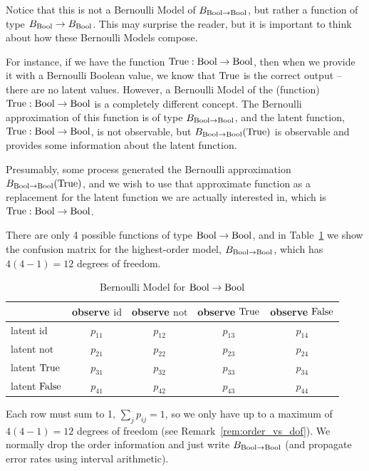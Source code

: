\documentclass[../main.tex]{subfiles}
\begin{document}
Notice that this is not a Bernoulli Model of $B_{\mathrm{Bool} \to \mathrm{Bool}}$, but rather a function of type $B_{\mathrm{Bool}} \to B_{\mathrm{Bool}}$. This may surprise the reader, but it is important to think about how these Bernoulli Models compose.

For instance, if we have the function $\mathrm{True} : \mathrm{Bool} \to \mathrm{Bool}$, then when we provide it with a Bernoulli Boolean value, we know that $\mathrm{True}$ is the correct output -- there are no latent values. However, a Bernoulli Model of the (function) $\mathrm{True} : \mathrm{Bool} \to \mathrm{Bool}$ is a completely different concept. The Bernoulli approximation of this function is of type $B_{\mathrm{Bool} \to \mathrm{Bool}}$, and the latent function, $\mathrm{True} : \mathrm{Bool} \to \mathrm{Bool}$, is not observable, but $B_{\mathrm{Bool} \to \mathrm{Bool}}(\mathrm{True})$ is observable and provides some information about the latent function.

Presumably, some process generated the Bernoulli approximation $B_{\mathrm{Bool} \to \mathrm{Bool}}(\mathrm{True})$, and we wish to use that approximate function as a replacement for the latent function we are actually interested in, which is $\mathrm{True} : \mathrm{Bool} \to \mathrm{Bool}$.

There are only 4 possible functions of type $\mathrm{Bool} \to \mathrm{Bool}$, and in Table~\ref{tbl:confusion_matrix} we show the confusion matrix for the highest-order model, $B_{\mathrm{Bool} \to \mathrm{Bool}}$, which has $4(4-1) = 12$ degrees of freedom.

\begin{table}[htbp]
\centering
\caption{Bernoulli Model for $\mathrm{Bool} \to \mathrm{Bool}$}
\label{tbl:confusion_matrix}
\begin{tabular}{@{}lcccc@{}}
\toprule
& observe $\mathrm{id}$ & observe $\mathrm{not}$ & observe $\mathrm{True}$ & observe $\mathrm{False}$ \\
\midrule
latent $\mathrm{id}$ & $p_{1 1}$ & $p_{1 2}$ & $p_{1 3}$ & $p_{1 4}$ \\
latent $\mathrm{not}$ & $p_{2 1}$ & $p_{2 2}$ & $p_{2 3}$ & $p_{2 4}$ \\
latent $\mathrm{True}$ & $p_{3 1}$ & $p_{3 2}$ & $p_{3 3}$ & $p_{3 4}$ \\
latent $\mathrm{False}$ & $p_{4 1}$ & $p_{4 2}$ & $p_{4 3}$ & $p_{4 4}$ \\
\bottomrule
\end{tabular}
\end{table}

Each row must sum to 1, $\sum_j p_{i j} = 1$, so we only have up to a maximum of $4 (4-1) = 12$ degrees of freedom (see Remark~\ref{rem:order_vs_dof}). We normally drop the order information and just write $B_{\mathrm{Bool} \to \mathrm{Bool}}$ (and propagate error rates using interval arithmetic).
\end{document}
